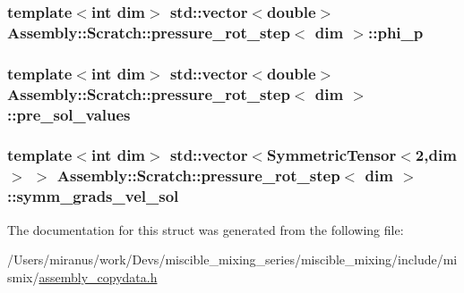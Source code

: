 \subsubsection[{phi\+\_\+p}]{\setlength{\rightskip}{0pt plus 5cm}template$<$int dim$>$ std\+::vector$<$double$>$ {\bf Assembly\+::\+Scratch\+::pressure\+\_\+rot\+\_\+step}$<$ dim $>$\+::phi\+\_\+p}\label{struct_assembly_1_1_scratch_1_1pressure__rot__step_aeaca955234a85e889b5c71e912240025}
\hypertarget{struct_assembly_1_1_scratch_1_1pressure__rot__step_a9de7969f5b98cb8dfc629301647b5c3e}{}
\subsubsection[{pre\+\_\+sol\+\_\+values}]{\setlength{\rightskip}{0pt plus 5cm}template$<$int dim$>$ std\+::vector$<$double$>$ {\bf Assembly\+::\+Scratch\+::pressure\+\_\+rot\+\_\+step}$<$ dim $>$\+::pre\+\_\+sol\+\_\+values}\label{struct_assembly_1_1_scratch_1_1pressure__rot__step_a9de7969f5b98cb8dfc629301647b5c3e}
\hypertarget{struct_assembly_1_1_scratch_1_1pressure__rot__step_a1bfe900ee774329a556f620ae765573b}{}
\subsubsection[{symm\+\_\+grads\+\_\+vel\+\_\+sol}]{\setlength{\rightskip}{0pt plus 5cm}template$<$int dim$>$ std\+::vector$<$Symmetric\+Tensor$<$2,dim$>$ $>$ {\bf Assembly\+::\+Scratch\+::pressure\+\_\+rot\+\_\+step}$<$ dim $>$\+::symm\+\_\+grads\+\_\+vel\+\_\+sol}\label{struct_assembly_1_1_scratch_1_1pressure__rot__step_a1bfe900ee774329a556f620ae765573b}


The documentation for this struct was generated from the following file\+:\begin{DoxyCompactItemize}
\item 
/\+Users/miranus/work/\+Devs/miscible\+\_\+mixing\+\_\+series/miscible\+\_\+mixing/include/mismix/\hyperlink{assembly__copydata_8h}{assembly\+\_\+copydata.\+h}\end{DoxyCompactItemize}
